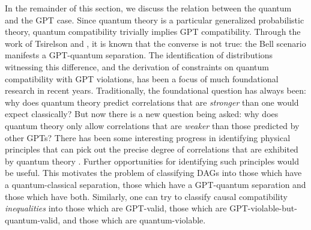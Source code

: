 {%

In the remainder of this section, we discuss the relation between the quantum and the GPT case. Since quantum theory is a particular generalized probabilistic theory, quantum compatibility trivially implies GPT compatibility. Through the work of Tsirelson \cite{Tsirelson1980} and \citet{PROriginal}, it is known that the converse is not true: the Bell scenario manifests a GPT-quantum separation.  The identification of distributions witnessing this difference, and the derivation of constraints on quantum compatibility with GPT violations, has been a focus of much foundational research in recent years. Traditionally, the foundational question has always been: why does quantum theory predict correlations that are {\em stronger} than one would expect classically?  But now there is a new question being asked: why does quantum theory only allow correlations that are {\em weaker} than those predicted by other GPTs?  There has been some interesting progress in identifying physical principles that can pick out the precise degree of correlations that are exhibited by quantum theory \cite{PopescuReviewNatureComm,ScaraniML,Rohrlich2014,InfoCausArXiv,LONatureComm,LOExploring,EPNBody,barnum2014interference,AlmostQuantum}.  Further opportunities for identifying such principles would be useful.  This motivates the problem of classifying DAGs into those which have a quantum-classical separation, those which have a GPT-quantum separation and those which have both. Similarly, one can try to classify causal compatibility \emph{inequalities} into those which are GPT-valid, those which are GPT-violable-but-quantum-valid, and those which are quantum-violable. 

}
